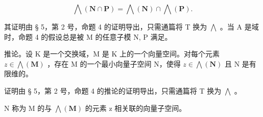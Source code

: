 \[
\bigwedge (\mathbf {N} \cap \mathbf {P}) = \bigwedge (\mathbf {N}) \cap \bigwedge (\mathbf {P}).\tag{5}
\]

其证明由 § 5，第 2 号，命题 4 的证明导出，只需通篇将 T 换为 \(\bigwedge\) 。当 A 是域时，命题 4 的假设总是被 M 的任意子模 N, P 满足。

推论。设 K 是一个交换域，M 是 K 上的一个向量空间。对每个元素 \(z \in \bigwedge(\mathbf{M})\) ，存在 M 的一个最小向量子空间 N，使得 \(z \in \bigwedge(\mathbf{N})\) 且 N 是有限维的。

证明由 § 5，第 2 号，命题 4 的推论的证明导出，只需通篇将 T 换为 \(\bigwedge\) 。

N 称为 M 的与 \(\bigwedge(\mathbf{M})\) 的元素 z 相关联的向量子空间。
